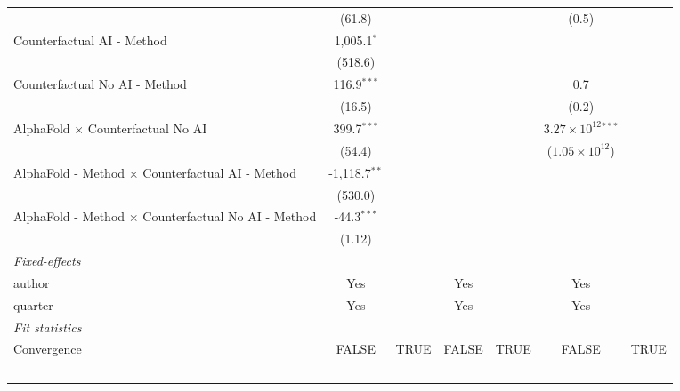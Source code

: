 \begin{tabular}{lcccccc}
                                                              & (61.8)          &      &         &      & (0.5)                         &   \\   
   Counterfactual AI - Method                                 & 1,005.1$^{*}$   &      &         &      &                               &   \\   
                                                              & (518.6)         &      &         &      &                               &   \\   
   Counterfactual No AI - Method                              & 116.9$^{***}$   &      &         &      & 0.7                           &   \\   
                                                              & (16.5)          &      &         &      & (0.2)                         &   \\   
   AlphaFold $\times$ Counterfactual No AI                    & 399.7$^{***}$   &      &         &      & $3.27\times 10^{12}$$^{***}$  &   \\   
                                                              & (54.4)          &      &         &      & ($1.05\times 10^{12}$)        &   \\   
   AlphaFold - Method $\times$ Counterfactual AI - Method     & -1,118.7$^{**}$ &      &         &      &                               &   \\   
                                                              & (530.0)         &      &         &      &                               &   \\   
   AlphaFold - Method $\times$ Counterfactual No AI - Method  & -44.3$^{***}$   &      &         &      &                               &   \\   
                                                              & (1.12)          &      &         &      &                               &   \\   
   \midrule
   \emph{Fixed-effects}\\
   author                                                     & Yes             &      & Yes     &      & Yes                           & \\  
   quarter                                                    & Yes             &      & Yes     &      & Yes                           & \\  
   \midrule
   \emph{Fit statistics}\\
   Convergence                                                &FALSE            & TRUE & FALSE   & TRUE & FALSE                         & TRUE\\  
$$
\end{tabular}
